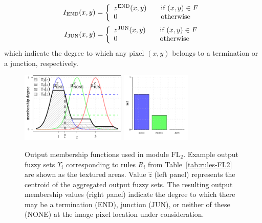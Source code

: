 \begin{equation}
I_{\textrm{END}}(x,y)=\left\{
\begin{array}{l@{\qquad}l}
z^{\textrm{END}}(x,y) & \textrm{if}\ (x,y)\in F \\
0 & \textrm{otherwise}
\end{array}
\right.
\end{equation}
\begin{equation}
I_{\textrm{JUN}}(x,y)=\left\{
\begin{array}{l@{\qquad}l}
z^{\textrm{JUN}}(x,y) & \textrm{if}\ (x,y)\in F \\
0 & \textrm{otherwise}
\end{array}
\right.
\end{equation}
which indicate the degree to which any pixel $(x,y)$ belongs to a termination or a junction, respectively.
\begin{figure}[ht!]
	\centering
	\includegraphics[height=9em]{fig10a}
	\includegraphics[height=9em]{fig10b}
	\caption{Output membership functions used in module $\mathrm{FL}_{2}$. Example output fuzzy sets $\Upsilon_{\!i}$ corresponding to rules $R_i$ from Table~\ref{tab:rules-FL2} are shown as the textured areas. Value $\hat{z}$ (left panel) represents the centroid of the aggregated output fuzzy sets. The resulting output membership values (right panel) indicate the degree to which there may be a termination (END), junction (JUN), or neither of these (NONE) at the image pixel location under consideration.}
	\label{fig10}
\end{figure}
